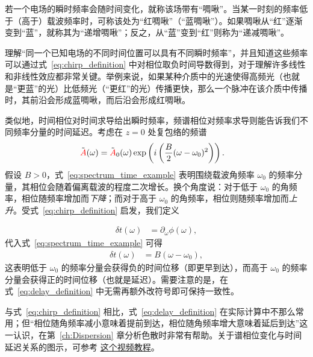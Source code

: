 若一个电场的瞬时频率会随时间变化，就称该场带有“啁啾”。当某一时刻的频率低于（高于）载波频率时，可称该处为“红啁啾”（“蓝啁啾”）。如果啁啾从“红”逐渐变到“蓝”，就称其为“递增啁啾”；反之，从“蓝”变到“红”则称为“递减啁啾”。

理解“同一个已知电场的不同时间位置可以具有不同瞬时频率”，并且知道这些频率可以通过式~\ref{eq:chirp_definition} 中对相位取负时间导数得到，对于理解许多线性和非线性效应都非常关键。举例来说，如果某种介质中的光速使得高频光（也就是“更蓝”的光）比低频光（“更红”的光）传播更快，那么一个脉冲在该介质中传播时，其前沿会形成蓝啁啾，而后沿会形成红啁啾。

类似地，时间相位对时间求导给出瞬时频率，频谱相位对频率求导则能告诉我们不同频率分量的时间延迟。考虑在 $z=0$ 处复包络的频谱
\begin{align}
\label{eq:spectrum_time_example}
    \Tilde{\textcolor{red}{A}}(\omega) &= \Tilde{\textcolor{red}{A}}_0(\omega)\exp\left( i\left(\frac{B}{2}(\omega-\omega_0)^2 \right)   \right).
\end{align}
假设 $B>0$，式~\ref{eq:spectrum_time_example} 表明围绕载波角频率 $\omega_0$ 的频率分量，其相位会随着偏离载波的程度二次增长。换个角度说：对于低于 $\omega_0$ 的角频率，相位随频率增加而\emph{下降}；而对于高于 $\omega_0$ 的角频率，相位则随频率增加而\emph{上升}。受式~\ref{eq:chirp_definition} 启发，我们定义

\begin{align}
\label{eq:delay_definition}
    \delta t(\omega) &= \partial_\omega\phi(\omega),
\end{align}
代入式~\ref{eq:spectrum_time_example} 可得
\begin{align}
    \delta t(\omega) &=  B(\omega-\omega_0),
\end{align}
这表明低于 $\omega_0$ 的频率分量会获得负的时间位移（即更早到达），而高于 $\omega_0$ 的频率分量会获得正的时间位移（也就是延迟）。需要注意的是，在式~\ref{eq:delay_definition} 中无需再额外改符号即可保持一致性。

与式~\ref{eq:chirp_definition} 相比，式~\ref{eq:delay_definition} 在实际计算中不那么常用；但“相位随角频率减小意味着提前到达，相位随角频率增大意味着延后到达”这一认识，在第~\ref{ch:Dispersion} 章分析色散时非常有帮助。关于谱相位变化与时间延迟关系的图示，可参考 \href{https://youtu.be/E3S0BQiy3p8}{这个视频教程}。
